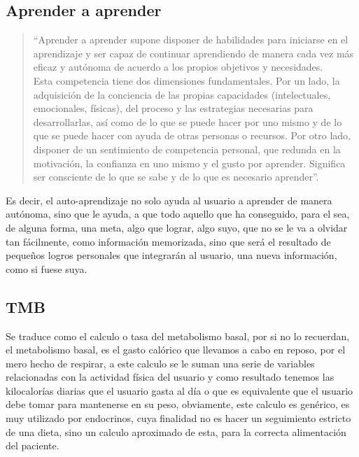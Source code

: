 \subsection{Aprender a aprender}
\begin{quote}
“Aprender a aprender supone disponer de habilidades para iniciarse en el aprendizaje y ser capaz de continuar aprendiendo de manera cada vez más eficaz y autónoma de acuerdo a los propios objetivos y necesidades.\\

Esta competencia tiene dos dimensiones fundamentales. Por un lado, la adquisición de la conciencia de las propias capacidades (intelectuales, emocionales, físicas), del proceso y las estrategias necesarias para desarrollarlas, así como de lo que se puede hacer por uno mismo y de lo que se puede hacer con ayuda de otras personas o recursos. Por otro lado, disponer de un sentimiento de competencia personal, que redunda en la motivación, la confianza en uno mismo y el gusto por aprender. Significa ser consciente de lo que se sabe y de lo que es necesario aprender”. \cite{aprederAAprender}


\end{quote}

Es decir, el auto-aprendizaje no solo ayuda al usuario a aprender de manera autónoma, sino que le ayuda, a que todo aquello que ha conseguido, para el sea, de alguna forma, una meta, algo que lograr, algo suyo, que no se le va a olvidar tan fácilmente, como información memorizada, sino que será el resultado de pequeños logros personales que integrarán al usuario, una nueva información, como si fuese suya.
\subsection{TMB}
Se traduce como el calculo o tasa del metabolismo basal, por si no lo recuerdan, el metabolismo basal, es el gasto calórico que llevamos a cabo en reposo, por el mero hecho de respirar, a este calculo se le suman una serie de variables relacionadas con la actividad física del usuario y como resultado tenemos las kilocalorías diarias que el usuario gasta al día o que es equivalente que el usuario debe tomar para mantenerse en su peso, obviamente, este calculo es genérico, es muy utilizado por endocrinos, cuya finalidad no es hacer un seguimiento estricto de una dieta, sino un calculo aproximado de esta, para la correcta alimentación del paciente.\\

